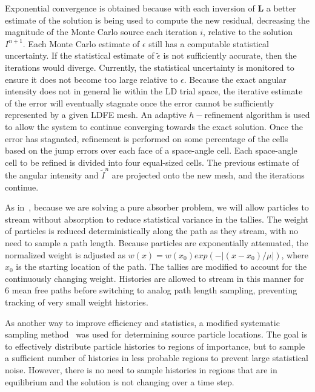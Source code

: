 \documentclass{mc2013}
\newcommand{\B}[1]{\ensuremath{\mathbf{#1}}}
\begin{document}
Exponential convergence is obtained because with each inversion of $\B L$ a
better estimate of the solution is being used to compute the new residual, decreasing
the magnitude of the Monte Carlo source each iteration $i$, relative to the solution
$I^{n+1}$.  Each Monte Carlo
estimate of $\epsilon$ still has a computable statistical uncertainty.  If the statistical estimate of $\tilde\epsilon$ is not sufficiently
accurate, then the iterations would diverge.  Currently, the statistical uncertainty
is monitored to ensure it does not become too large relative to $\epsilon$.
Because the exact angular intensity does not in general lie within the LD trial space, the
iterative estimate of the error will eventually stagnate once the error cannot be sufficiently
represented by a given LDFE mesh.  An adaptive $h-$refinement algorithm is used
to allow the system to continue converging towards the exact solution.  Once the
error has stagnated, refinement is performed on some percentage of the cells
based on the jump errors over each face of a space-angle cell.  Each space-angle cell
to be refined is divided into four equal-sized cells.  The previous estimate of the
angular intensity and $\tilde{I}^{n}$ are projected onto the new mesh, and the
iterations continue. 


As in~\cite{park}, because we are solving a pure absorber problem, we will allow
particles to stream without absorption to reduce statistical 
variance in the tallies.  The weight of particles is reduced deterministically along
the path as they stream, with no need to sample a path length.  Because particles are exponentially attenuated, the normalized weight is
adjusted as $w(x) = w(x_0)exp(-|(x-x_0)/\mu|)$, where $x_0$ is the starting location of the path.  The tallies are modified to account
for the continuously changing weight. Histories are allowed to stream in this manner for 6 mean free paths
before switching to analog path length sampling, preventing tracking of very small weight histories.

As another way to improve efficiency and statistics, a modified systematic
sampling
method~\cite{shultis_mc} was used for determining source particle locations.  The goal is to effectively distribute particle
histories to regions of importance, but to sample a sufficient number of histories in
less probable regions to prevent large statistical noise.  However, there is no need
to sample histories in regions that are in equilibrium and the solution is not
changing over a time step. %
\end{document}
